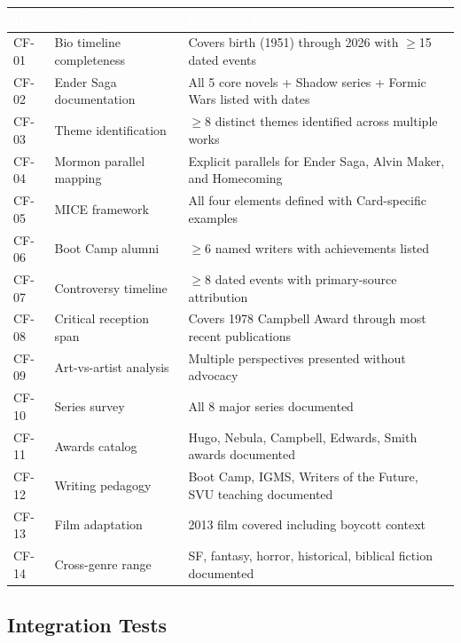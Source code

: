 \documentclass[11pt,letterpaper]{article}
\newcommand{\tableheader}[1]{\textbf{\sffamily\textcolor{white}{#1}}}
\begin{document}
\begin{center}
\begin{tabularx}{\textwidth}{C{1.2cm}L{3.5cm}X}
\toprule
{}
\tableheader{ID} & \tableheader{Verifies} & \tableheader{Expected Behavior} \\
\midrule
CF-01 & Bio timeline completeness & Covers birth (1951) through 2026 with $\geq$15 dated events \\
CF-02 & Ender Saga documentation & All 5 core novels + Shadow series + Formic Wars listed with dates \\
CF-03 & Theme identification & $\geq$8 distinct themes identified across multiple works \\
CF-04 & Mormon parallel mapping & Explicit parallels for Ender Saga, Alvin Maker, and Homecoming \\
CF-05 & MICE framework & All four elements defined with Card-specific examples \\
CF-06 & Boot Camp alumni & $\geq$6 named writers with achievements listed \\
CF-07 & Controversy timeline & $\geq$8 dated events with primary-source attribution \\
CF-08 & Critical reception span & Covers 1978 Campbell Award through most recent publications \\
CF-09 & Art-vs-artist analysis & Multiple perspectives presented without advocacy \\
CF-10 & Series survey & All 8 major series documented \\
CF-11 & Awards catalog & Hugo, Nebula, Campbell, Edwards, Smith awards documented \\
CF-12 & Writing pedagogy & Boot Camp, IGMS, Writers of the Future, SVU teaching documented \\
CF-13 & Film adaptation & 2013 film covered including boycott context \\
CF-14 & Cross-genre range & SF, fantasy, horror, historical, biblical fiction documented \\
\bottomrule
\end{tabularx}
\end{center}

\subsection{Integration Tests}
\end{document}
